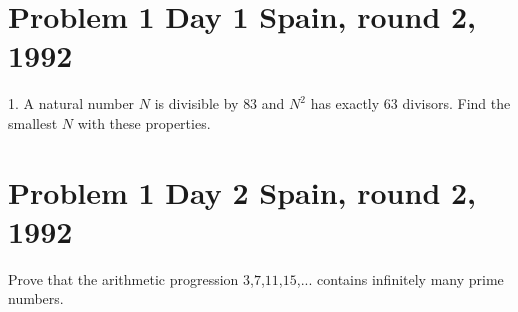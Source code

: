 \documentclass[]{article}
\title{}
\author{}
\begin{document}
\maketitle

\begin{abstract}

\end{abstract}

\section{Problem 1 Day 1 Spain, round 2, 1992}
1. A natural number $N$ is divisible by $83$ and $N^2$ has exactly $63$ divisors. Find the smallest $N$ with these properties.

\section{Problem 1 Day 2 Spain, round 2, 1992}
Prove that the arithmetic progression $3$,$7$,$11$,$15$,$...$ contains infinitely many
prime numbers.
\end{document}
